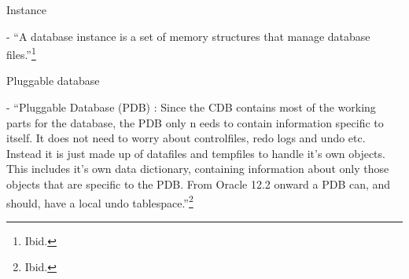 \begin{itemize*}
\item{\begin{bf}Instance\end{bf}} - ``A database instance
  is a set of memory structures that manage database files.''\footnote{Ibid.}
  

\item{\begin{bf}Pluggable database\end{bf}} - ``Pluggable Database (PDB) : Since 
the CDB contains most of the working parts for the database, the PDB only n
eeds to contain information specific to itself. It does not need to worry about 
controlfiles, redo logs and undo etc. Instead it is just made up of datafiles 
and tempfiles to handle it's own objects. This includes it's own data dictionary, 
containing information about only those objects that are specific to the PDB. 
From Oracle 12.2 onward a PDB can, and should, have a local undo tablespace.''\footnote{Ibid.}


\end{itemize*}




